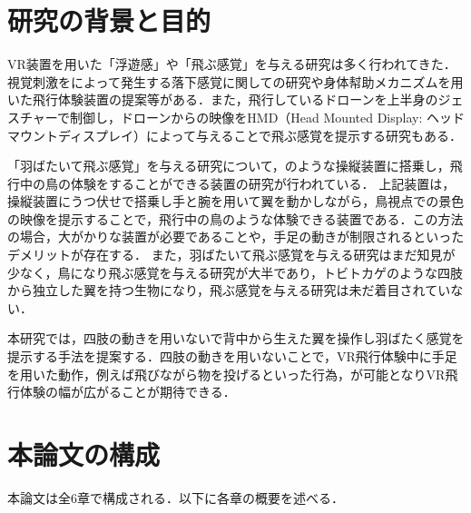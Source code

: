 \section{研究の背景と目的}

        VR装置を用いた「浮遊感」や「飛ぶ感覚」を与える研究は多く行われてきた．視覚刺激をによって発生する落下感覚に関しての研究\cite{奥川夏輝2017VR空間における視覚刺激によって発生する落下感覚の分析}や身体幇助メカニズムを用いた飛行体験装置の提案\cite{鈴木拓馬2014hmd}等がある．また，飛行しているドローンを上半身のジェスチャーで制御し，ドローンからの映像をHMD（Head Mounted Display: ヘッドマウントディスプレイ）によって与えることで飛ぶ感覚を提示する研究\cite{rognon2018flyjacket}もある．


        「羽ばたいて飛ぶ感覚」を与える研究について，のような操縦装置に搭乗し，飛行中の鳥の体験をすることができる装置の研究が行われている\cite{rheiner2014birdly}\cite{hypersuit}．
        上記装置は，操縦装置にうつ伏せで搭乗し手と腕を用いて翼を動かしながら，鳥視点での景色の映像を提示することで，飛行中の鳥のような体験できる装置である．この方法の場合，大がかりな装置が必要であることや，手足の動きが制限されるといったデメリットが存在する．
        また，羽ばたいて飛ぶ感覚を与える研究はまだ知見が少なく，鳥になり飛ぶ感覚を与える研究が大半であり，トビトカゲのような四肢から独立した翼を持つ生物になり，飛ぶ感覚を与える研究は未だ着目されていない．

        本研究では，四肢の動きを用いないで背中から生えた翼を操作し羽ばたく感覚を提示する手法を提案する．四肢の動きを用いないことで，VR飛行体験中に手足を用いた動作，例えば飛びながら物を投げるといった行為，が可能となりVR飛行体験の幅が広がることが期待できる．

\section{本論文の構成}
        
        本論文は全6章で構成される．以下に各章の概要を述べる．

